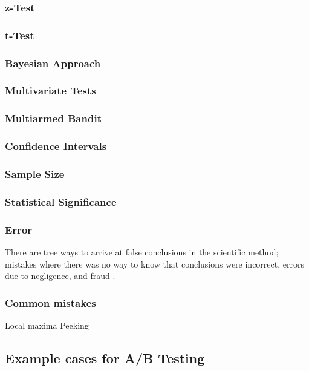 \documentclass[english,12pt,a4paper,pdftex,elec,utf8]{aaltothesis}
\begin{document}
\subsubsection{z-Test}
\subsubsection{t-Test}
\subsubsection{Bayesian Approach}
\subsubsection{Multivariate Tests}
\subsubsection{Multiarmed Bandit}
\subsubsection{Confidence Intervals}
\subsubsection{Sample Size}
\subsubsection{Statistical Significance}
\subsubsection{Error}
There are tree ways to arrive at false conclusions in the scientific method; mistakes where there was no way to know that conclusions were incorrect, errors due to negligence, and fraud \cite{Crawford1990}.
\subsubsection{Common mistakes}
Local maxima
Peeking

\subsection{Example cases for A/B Testing}
\end{document}
